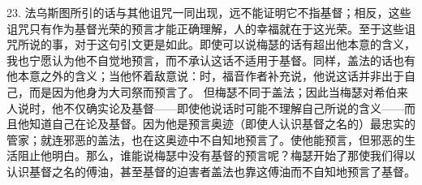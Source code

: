 23. 法乌斯图所引的话与其他诅咒一同出现，远不能证明它不指基督；相反，这些诅咒只有作为基督光荣的预言才能正确理解，人的幸福就在于这光荣。至于这些诅咒所说的事，对于这句引文更是如此。即使可以说梅瑟的话有超出他本意的含义，我也宁愿认为他不自觉地预言，而不承认这话不适用于基督。同样，盖法的话也有他本意之外的含义；当他怀着敌意说：时，福音作者补充说，他说这话并非出于自己，而是因为他身为大司祭而预言了。 但梅瑟不同于盖法；因此当梅瑟对希伯来人说时，他不仅确实论及基督——即使他说话时可能不理解自己所说的含义——而且他知道自己在论及基督。因为他是预言奥迹（即使人认识基督之名的）最忠实的管家；就连邪恶的盖法，也在这奥迹中不自知地预言了。使他能预言，但邪恶的生活阻止他明白。那么，谁能说梅瑟中没有基督的预言呢？梅瑟开始了那使我们得以认识基督之名的傅油，甚至基督的迫害者盖法也靠这傅油而不自知地预言了基督。\par

